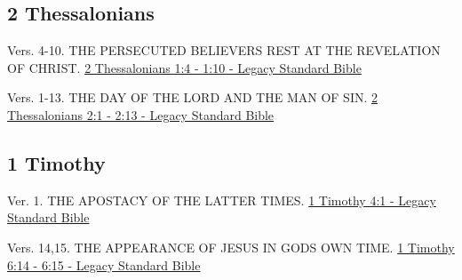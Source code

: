 \documentclass[
  ignorenonframetext,
]{beamer}
\begin{document}
\subsection{2 Thessalonians}\label{thessalonians-1}

\begin{frame}{1}
\label{section-225}
\begin{block}{Vers. 4-10. THE PERSECUTED BELIEVER\textquotesingle S REST
AT THE REVELATION OF CHRIST.}
\label{vers.-4-10.-the-persecuted-believers-rest-at-the-revelation-of-christ.}
\href{https://read.lsbible.org/?q=2th1\%3A4-10}{2 Thessalonians 1:4 -
1:10 - Legacy Standard Bible}
\end{block}
\end{frame}

\begin{frame}{2}
\label{section-226}
\begin{block}{Vers. 1-13. THE DAY OF THE LORD AND THE MAN OF SIN.}
\label{vers.-1-13.-the-day-of-the-lord-and-the-man-of-sin.}
\href{https://read.lsbible.org/?q=2th2\%3A1-13}{2 Thessalonians 2:1 -
2:13 - Legacy Standard Bible}
\end{block}
\end{frame}

\subsection{1 Timothy}\label{timothy}

\begin{frame}{4}
\label{section-227}
\begin{block}{Ver. 1. THE APOSTACY OF THE LATTER TIMES.}
\label{ver.-1.-the-apostacy-of-the-latter-times.}
\href{https://read.lsbible.org/?q=1tim4\%3A1}{1 Timothy 4:1 - Legacy
Standard Bible}
\end{block}
\end{frame}

\begin{frame}{6}
\label{section-228}
\begin{block}{Vers. 14,15. THE APPEARANCE OF JESUS IN
GOD\textquotesingle S OWN TIME.}
\label{vers.-1415.-the-appearance-of-jesus-in-gods-own-time.}
\href{https://read.lsbible.org/?q=1tim6\%3A14-15}{1 Timothy 6:14 - 6:15
- Legacy Standard Bible}
\end{block}
\end{frame}
\end{document}
